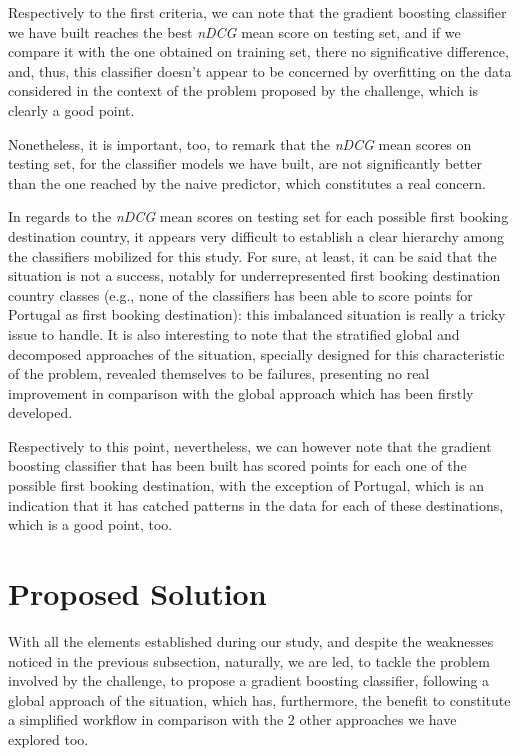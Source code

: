 \documentclass[twocolumn, switch]{article}
\begin{document}
Respectively to the first criteria, we can note that the gradient boosting classifier we have built reaches the best \textit{nDCG} mean score on testing set, and if we compare it with the one obtained on training set, there no significative difference, and, thus, this classifier doesn't appear to be concerned by overfitting on the data considered in the context of the problem proposed by the challenge, which is clearly a good point.

Nonetheless, it is important, too, to remark that the \textit{nDCG} mean scores on testing set, for the classifier models we have built, are not significantly better than the one reached by the naive predictor, which constitutes a real concern.

In regards to the \textit{nDCG} mean scores on testing set for each possible first booking destination country, it appears very difficult to establish a clear hierarchy among the classifiers mobilized for this study. For sure, at least, it can be said that the situation is not a success, notably for underrepresented first booking destination country classes (e.g., none of the classifiers has been able to score points for Portugal as first booking destination): this imbalanced situation is really a tricky issue to handle. It is also interesting to note that the stratified global and decomposed approaches of the situation, specially designed for this characteristic of the problem, revealed themselves to be failures, presenting no real improvement in comparison with the global approach which has been firstly developed.

Respectively to this point, nevertheless, we can however note that the gradient boosting classifier that has been built has scored points for each one of the possible first booking destination, with the exception of Portugal, which is an indication that it has catched patterns in the data for each of these destinations, which is a good point, too.


\section{Proposed Solution}

With all the elements established during our study, and despite the weaknesses noticed in the previous subsection, naturally, we are led, to tackle the problem involved by the challenge, to propose a gradient boosting classifier, following a global approach of the situation, which has, furthermore, the benefit to constitute a simplified workflow in comparison with the $2$ other approaches we have explored too.
\end{document}
